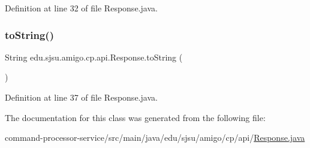 Definition at line 32 of file Response.\+java.

\mbox{\label{classedu_1_1sjsu_1_1amigo_1_1cp_1_1api_1_1_response_a19b9978ae39ca96ccdc8ec6fe3faf7e2}} 
\subsubsection{\texorpdfstring{to\+String()}{toString()}}
{\footnotesize\ttfamily String edu.\+sjsu.\+amigo.\+cp.\+api.\+Response.\+to\+String (\begin{DoxyParamCaption}{ }\end{DoxyParamCaption})}



Definition at line 37 of file Response.\+java.



The documentation for this class was generated from the following file\+:\begin{DoxyCompactItemize}
\item 
command-\/processor-\/service/src/main/java/edu/sjsu/amigo/cp/api/\hyperlink{command-processor-service_2src_2main_2java_2edu_2sjsu_2amigo_2cp_2api_2_response_8java}{Response.\+java}\end{DoxyCompactItemize}
